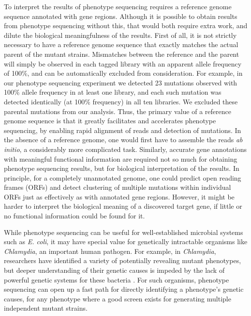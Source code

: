\documentclass[letterpaper,10pt,english]{howto}
\begin{document}
To interpret the results of phenotype sequencing
requires a reference genome sequence annotated with gene regions.
Although it is possible to obtain results from phenotype sequencing
without this, that would both require extra work, and dilute the
biological meaningfulness of the results.  First of all, it is
not strictly necessary to have a reference genome sequence that
exactly matches the actual parent of the mutant strains.  Mismatches
between the reference and the parent will simply be observed
in each tagged library with an apparent allele frequency
of 100\%, and can be automatically excluded from consideration.
For example, in our phenotype sequencing experiment we detected 23 mutations
observed with 100\% allele frequency in at least one library, and each such
mutation was detected identically (at 100\% frequency) in all ten libraries.
We excluded these parental mutations from our analysis.
Thus, the primary value of a reference genome sequence is that it
greatly facilitates and accelerates phenotype sequencing, by enabling
rapid alignment of reads and detection of mutations.  In the absence
of a reference genome, one would first have to assemble the reads \emph{ab initio},
a considerably more complicated task.  Similarly, accurate gene
annotations with meaningful functional information are required not
so much for obtaining phenotype sequencing results, but for
biological interpretation of the results.  In principle, for
a completely unannotated genome, one could predict open reading
frames (ORFs) and detect clustering of multiple mutations within
individual ORFs just as effectively as with annotated gene regions.
However, it might be harder to interpret the biological meaning
of a discovered target gene, if little or no functional information
could be found for it.

While phenotype sequencing can be useful for well-established
microbial systems such as \emph{E. coli}, it may have special value
for genetically intractable organisms like \emph{Chlamydia},
an important human pathogen.  For example, in \emph{Chlamydia}, researchers
have identified a variety of potentially revealing mutant
phenotypes, but deeper understanding of their genetic causes
is impeded by the lack of powerful genetic systems for these
bacteria \cite{Cocchiaro2009} .  For such organisms,
phenotype sequencing can open up a fast path for directly
identifying a phenotype's genetic causes, for any phenotype
where a good
screen exists for generating multiple independent mutant strains.
\end{document}
